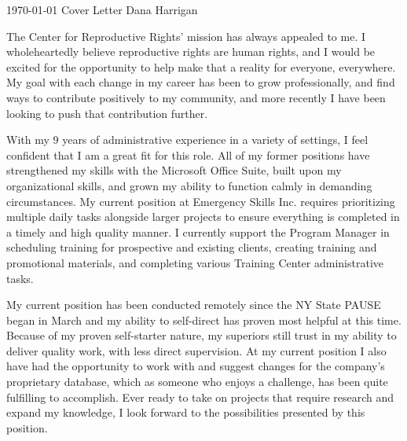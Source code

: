\documentclass[11pt, a4paper]{awesome-cv}
\begin{document}
\makecvheader[R]

\makecvfooter
  {\today}
  {Cover Letter}
  {Dana Harrigan}

\makelettertitle

\begin{cvletter}

The Center for Reproductive Rights’ mission has always appealed to me. I wholeheartedly believe reproductive rights are human rights, and I would be excited for the opportunity to help make that a reality for everyone, everywhere. My goal with each change in my career has been to grow professionally, and find ways to contribute positively to my community, and more recently I have been looking to push that contribution further.

With my 9 years of administrative experience in a variety of settings, I feel confident that I am a great fit for this role. All of my former positions have strengthened my skills with the Microsoft Office Suite, built upon my organizational skills, and grown my ability to function calmly in demanding circumstances. My current position at Emergency Skills Inc. requires prioritizing multiple daily tasks alongside larger projects to ensure everything is completed in a timely and high quality manner. I currently support the Program Manager in scheduling training for prospective and existing clients, creating training and promotional materials, and completing various Training Center administrative tasks.

My current position has been conducted remotely since the NY State PAUSE began in March and my ability to self-direct has proven most helpful at this time. Because of my proven self-starter nature, my superiors still trust in my ability to deliver quality work, with less direct supervision. At my current position I also have had the opportunity to work with and suggest changes for the company’s proprietary database, which as someone who enjoys a challenge, has been quite fulfilling to accomplish. Ever ready to take on projects that require research and expand my knowledge, I look forward to the possibilities presented by this position.


\end{cvletter}
\end{document}
